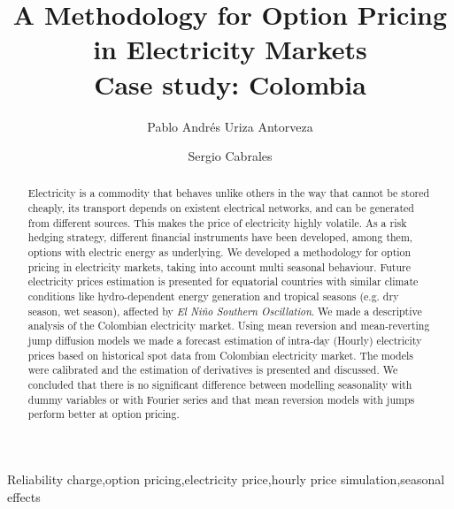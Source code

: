 \documentclass[3p]{elsarticle}
\begin{document}
\begin{frontmatter}

\title{A Methodology for Option Pricing in Electricity Markets\\Case study: Colombia}


\author[mainaddress]{Pablo Andr\'es Uriza Antorveza
}


\author[mainaddress]{Sergio Cabrales}

\address[mainaddress]{Universidad de los Andes Carrera 1 Este  No. 19A - Bogot\'a, Colombia}


\begin{abstract}
Electricity is a commodity that behaves unlike others in the way that cannot be stored cheaply, its transport depends on existent electrical networks, and can be generated from different sources. This makes the price of electricity highly volatile. As a risk hedging strategy, different financial instruments have been developed, among them, options with electric energy as underlying. We developed a methodology for option pricing in electricity markets, taking into account multi seasonal behaviour. Future electricity prices estimation is presented for equatorial countries with similar climate conditions like hydro-dependent energy generation and tropical seasons (e.g. dry season, wet season), affected by \emph{El Ni\~no Southern Oscillation}. We made a descriptive analysis of the Colombian electricity market. Using mean reversion and mean-reverting jump diffusion models we made a forecast estimation of intra-day (Hourly) electricity prices based on historical spot data from Colombian electricity market. The models were calibrated and the estimation of derivatives is presented and discussed. We concluded that there is no significant difference between modelling seasonality with dummy variables or with Fourier series and that mean reversion models with jumps perform better at option pricing.
\end{abstract}

\begin{keyword}
Reliability charge\sep option pricing\sep electricity price\sep hourly price simulation\sep seasonal effects
\end{keyword}

\end{frontmatter}
\end{document}
